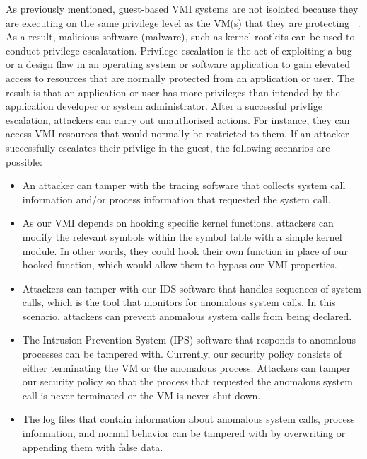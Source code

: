 \documentclass{report}
\begin{document}
\begin{spacing}{1.5}
{\large
\noindent As previously mentioned, guest-based VMI systems are not isolated because they are executing on the same privilege level as the VM(s) that they are protecting ~\cite{10.1145/2775111}. As a result, malicious software (malware), such as kernel rootkits can be used to conduct privilege escalatation. Privilege escalation is the act of exploiting a bug or a design flaw in an operating system or software application to gain elevated access to resources that are normally protected from an application or user. The result is that an application or user has more privileges than intended by the application developer or system administrator. After a successful privlige escalation, attackers can carry out unauthorised actions. For instance, they can access VMI resources that would normally be restricted to them. If an attacker successfully escalates their privlige in the guest, the following scenarios are possible:
\newline
}


{\large
\begin{itemize}
\item An attacker can tamper with the tracing software that collects system call information and/or process information that requested the system call. 

\item As our VMI depends on hooking specific kernel functions, attackers can modify the relevant symbols within the symbol table with a simple kernel module. In other words, they could hook their own function in place of our hooked function, which would allow them to bypass our VMI properties. 

\item Attackers can tamper with our IDS software that handles sequences of system calls, which is the tool that monitors for anomalous system calls. In this scenario, attackers can prevent anomalous system calls from being declared.

\item The Intrusion Prevention System (IPS) software that responds to anomalous processes can be tampered with. Currently, our security policy consists of either terminating the VM or the anomalous process. Attackers can tamper our security policy so that the process that requested the anomalous system call is never terminated or the VM is never shut down.

\item The log files that contain information about anomalous system calls, process information, and normal behavior can be tampered with by overwriting or appending them with false data. 
\end{itemize}
}


\end{spacing}
\end{document}
